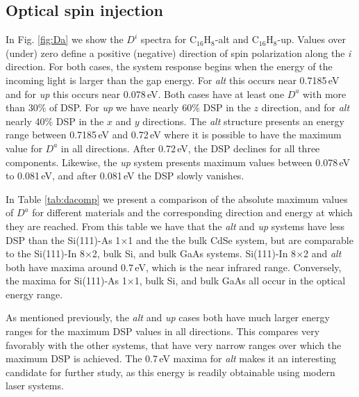 \documentclass[pss]{wiley2sp} %
\begin{document}
\subsection{Optical spin injection}

In Fig. \ref{fig:Da} we show the $D^{i}$ spectra for C$_{16}$H$_{8}$-alt and C$_{16}$H$_{8}$-up. Values over (under) zero define a positive (negative) direction of spin polarization along the \emph{i} direction. For both cases, the system response begins when the energy of the incoming light is larger than the gap energy. For \emph{alt} this occurs near 0.7185\,eV and for \emph{up} this occurs near 0.078\,eV. Both cases have at least one {$D^{a}$} with more than 30\% of DSP. For \emph{up} we have nearly 60\% DSP in the $z$ direction, and for \emph{alt} nearly 40\% DSP in the $x$ and $y$ directions. The \emph{alt} structure presents an energy range between 0.7185\,eV and 0.72\,eV where it is possible to have the maximum value for $D^{a}$ in all directions. After 0.72\,eV, the DSP declines for all three components. Likewise, the \emph{up} system presents maximum values between 0.078\,eV to 0.081\,eV, and after 0.081\,eV the DSP slowly vanishes. 

In Table \ref{tab:dacomp} we present a comparison of the absolute maximum values of $D^{a}$ for different materials and the corresponding direction and energy at which they are reached. From this table we have that the \emph{alt} and \emph{up} systems have less DSP than the Si(111)-As 1$\times$1 and the the bulk CdSe system, but are comparable to the Si(111)-In 8$\times$2, bulk Si, and bulk GaAs systems. Si(111)-In 8$\times$2 and \emph{alt} both have maxima around 0.7\,eV, which is the near infrared range. Conversely, the maxima for Si(111)-As 1$\times$1, bulk Si, and bulk GaAs all occur in the optical energy range.

As mentioned previously, the \emph{alt} and \emph{up} cases both have much larger energy ranges for the maximum DSP values in all directions. This compares very favorably with the other systems, that have very narrow ranges over which the maximum DSP is achieved. The 0.7\,eV maxima for \emph{alt} makes it an interesting candidate for further study, as this energy is readily obtainable using modern laser systems.
\end{document}

